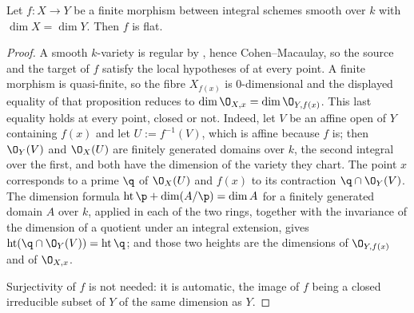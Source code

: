 \begin{corollary}
\label{cor:deg-finite-smooth-flat}
Let $f\colon X\to Y$ be a finite morphism between integral schemes smooth over
$k$ with $\dim X=\dim Y$.  Then $f$ is flat.
\end{corollary}
\begin{proof}
A smooth $k$-variety is regular by , hence
Cohen--Macaulay, so the source and the target of $f$ satisfy the local
hypotheses of  at every point.  A finite
morphism is quasi-finite, so the fibre $X_{f(x)}$ is $0$-dimensional and the
displayed equality of that proposition reduces to
$\dim\O_{X,x}=\dim\O_{Y,f(x)}$.  This last equality holds at every point,
closed or not.  Indeed, let $V$ be an affine open of $Y$ containing $f(x)$ and
let $U:=f^{-1}(V)$, which is affine because $f$ is; then $\O_Y(V)$ and
$\O_X(U)$ are finitely generated domains over $k$, the second integral over the
first, and both have the dimension of the variety they chart.  The point $x$
corresponds to a prime $\q$ of $\O_X(U)$ and $f(x)$ to its contraction
$\q\cap\O_Y(V)$.  The dimension formula
$\operatorname{ht}\p+\dim(A/\p)=\dim A$ for a finitely generated domain $A$
over $k$, applied in each of the two rings, together with the invariance of the
dimension of a quotient under an integral extension, gives
$\operatorname{ht}(\q\cap\O_Y(V))=\operatorname{ht}\q$; and those two heights
are the dimensions of $\O_{Y,f(x)}$ and of $\O_{X,x}$.

Surjectivity of $f$ is not needed: it is automatic, the image of $f$ being a
closed irreducible subset of $Y$ of the same dimension as $Y$.
\end{proof}

